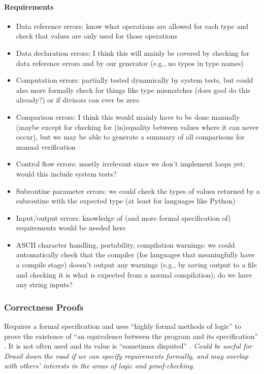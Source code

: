 \paragraph{Requirements}
\begin{itemize}
      \item Data reference errors: know what operations are allowed for each
            type and check that values are only used for those operations
      \item Data declaration errors: I think this will mainly be covered by
            checking for data reference errors and by our generator (e.g., no
            typos in type names)
      \item Computation errors: partially tested dynamically by system tests,
            but could also more formally check for things like type mismatches
            (does \acs{gool} do this already?) or if divisors can ever be zero
      \item Comparison errors: I think this would mainly have to be done
            manually (maybe except for checking for (in)equality between values
            where it can never occur), but we may be able to generate a summary
            of all comparisons for manual verification
      \item Control flow errors: mostly irrelevant since we don't implement
            loops yet; would this include system tests?
      \item Subroutine parameter errors: we could check the types of values
            returned by a subroutine with the expected type (at least for
            languages like Python)
      \item Input/output errors: knowledge of (and more formal specification of)
            requirements would be needed here
      \item ASCII character handling, portability, compilation warnings:
            we could automatically check that the compiler (for languages that
            meaningfully have a compile stage) doesn't output any warnings
            (e.g., by saving output to a file and checking it is what is
            expected from a normal compilation); do we have any string inputs?
\end{itemize}

\subsubsection{Correctness Proofs \cite[pp.~418-419]{van_vliet_software_2000}}
Requires a formal specification \cite[p.~418]{van_vliet_software_2000} and uses
``highly formal methods of logic'' \cite[p.~438]{peters_software_2000} to prove
the existence of ``an equivalence between the program and its specification''
\cite[p.~485]{peters_software_2000}. It is not often used and its value is
``sometimes disputed'' \cite[p.~418]{van_vliet_software_2000}.
\emph{Could be useful for Drasil down
      the road if we can specify requirements formally, and may overlap with
      others' interests in the areas of logic and proof-checking.}

